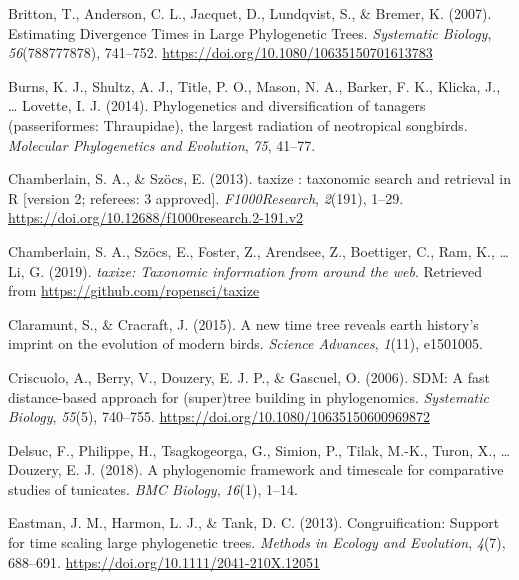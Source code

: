 \documentclass[
  english,
  man]{apa6}
\newlength{\cslhangindent}
\newlength{\cslentryspacingunit} %
\newenvironment{CSLReferences}[2] %
 {%
  \setlength{\parindent}{0pt}
  \ifodd #1
  \let\oldpar\par
  \def\par{\hangindent=\cslhangindent\oldpar}
  \fi
  \setlength{\parskip}{#2\cslentryspacingunit}
 }%
 {}
\begin{document}
\begin{CSLReferences}{1}{0}
\leavevmode{}%
Britton, T., Anderson, C. L., Jacquet, D., Lundqvist, S., \& Bremer, K. (2007). {Estimating Divergence Times in Large Phylogenetic Trees}. \emph{{Systematic Biology}}, \emph{56}(788777878), 741--752. \url{https://doi.org/10.1080/10635150701613783}

\leavevmode{}%
Burns, K. J., Shultz, A. J., Title, P. O., Mason, N. A., Barker, F. K., Klicka, J., \ldots{} Lovette, I. J. (2014). Phylogenetics and diversification of tanagers (passeriformes: Thraupidae), the largest radiation of neotropical songbirds. \emph{{Molecular Phylogenetics and Evolution}}, \emph{75}, 41--77.

\leavevmode{}%
Chamberlain, S. A., \& Szöcs, E. (2013). {taxize : taxonomic search and retrieval in R {[}version 2; referees: 3 approved{]}}. \emph{{F1000Research}}, \emph{2}(191), 1--29. \url{https://doi.org/10.12688/f1000research.2-191.v2}

\leavevmode{}%
Chamberlain, S. A., Szöcs, E., Foster, Z., Arendsee, Z., Boettiger, C., Ram, K., \ldots{} Li, G. (2019). \emph{{taxize: Taxonomic information from around the web}}. Retrieved from \url{https://github.com/ropensci/taxize}

\leavevmode{}%
Claramunt, S., \& Cracraft, J. (2015). A new time tree reveals earth history's imprint on the evolution of modern birds. \emph{{Science Advances}}, \emph{1}(11), e1501005.

\leavevmode{}%
Criscuolo, A., Berry, V., Douzery, E. J. P., \& Gascuel, O. (2006). {SDM: A fast distance-based approach for (super)tree building in phylogenomics}. \emph{{Systematic Biology}}, \emph{55}(5), 740--755. \url{https://doi.org/10.1080/10635150600969872}

\leavevmode{}%
Delsuc, F., Philippe, H., Tsagkogeorga, G., Simion, P., Tilak, M.-K., Turon, X., \ldots{} Douzery, E. J. (2018). A phylogenomic framework and timescale for comparative studies of tunicates. \emph{BMC Biology}, \emph{16}(1), 1--14.

\leavevmode{}%
Eastman, J. M., Harmon, L. J., \& Tank, D. C. (2013). {Congruification: Support for time scaling large phylogenetic trees}. \emph{{Methods in Ecology and Evolution}}, \emph{4}(7), 688--691. \url{https://doi.org/10.1111/2041-210X.12051}


\end{CSLReferences}
\end{document}

